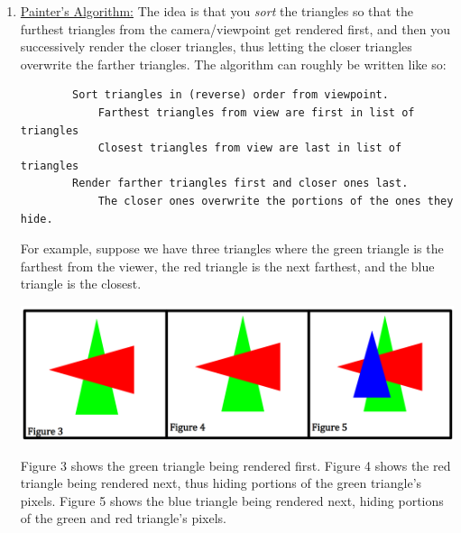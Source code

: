 \documentclass[letterpaper]{article}
\begin{document}
\begin{enumerate}
    \item \underline{Painter's Algorithm:} The idea is that you \emph{sort} the triangles so that the furthest triangles from the camera/viewpoint get rendered first, and then you successively render the closer triangles, thus letting the closer triangles overwrite the farther triangles. The algorithm can roughly be written like so: 
    \begin{verbatim}
        Sort triangles in (reverse) order from viewpoint.
            Farthest triangles from view are first in list of triangles 
            Closest triangles from view are last in list of triangles 
        Render farther triangles first and closer ones last. 
            The closer ones overwrite the portions of the ones they hide.\end{verbatim}
    For example, suppose we have three triangles where the green triangle is the farthest from the viewer, the red triangle is the next farthest, and the blue triangle is the closest. 
    \begin{center}
        \includegraphics[scale=0.4]{../assets/hidden2.png}
    \end{center}
    Figure 3 shows the green triangle being rendered first. Figure 4 shows the red triangle being rendered next, thus hiding portions of the green triangle's pixels. Figure 5 shows the blue triangle being rendered next, hiding portions of the green and red triangle's pixels. 

    \bigskip 


\end{enumerate}
\end{document}
